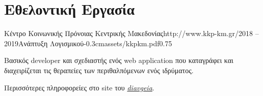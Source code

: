 \documentclass{mycv}
\begin{document}
	\section{Εθελοντική Εργασία}
	\begin{EntryDatedLogo}{Κέντρο Κοινωνικής Πρόνοιας Κεντρικής Μακεδονίας}{http://www.kkp-km.gr/}{2018 -- 2019}{Ανάπτυξη Λογισμικού}{-0.3cm}{assets/kkpkm.pdf}{0.75}
		\begin{Itemize}
			\item Βασικός developer και σχεδιαστής ενός web application που καταγράφει και διαχειρίζεται τις θεραπείες των περιθαλπόμενων ενός ιδρύματος.
			\item Περισσότερες πληροφορείες στο site του  \href{https://diavgeia.gov.gr/decision/view/\%CE\%A8\%CE\%A6\%CE\%A1\%CE\%93\%CE\%9F\%CE\%9E\%CE\%A7\%CE\%A3-\%CE\%A0\%CE\%93\%CE\%A6}{\textit{diavgeia}}.
		\end{Itemize}
	\end{EntryDatedLogo}
\end{document}
